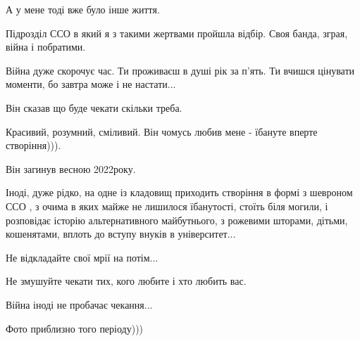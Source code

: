 А у мене тоді вже було інше життя. 

Підрозділ ССО в який я з такими жертвами пройшла відбір. Своя банда, зграя,
війна і побратими. 

Війна дуже скорочує час. Ти проживаєш в душі рік за п'ять. Ти вчишся цінувати
моменти, бо завтра може і не настати...

Він сказав що буде чекати скільки треба.

Красивий, розумний, сміливий. Він  чомусь любив мене - їбануте вперте
створіння))).

Він загинув весною 2022року. 

Іноді, дуже рідко, на одне із  кладовищ приходить створіння в формі з шевроном
ССО , з очима в яких майже не лишилося їбанутості, стоїть біля могили, і
розповідає історію альтернативного майбутнього, з рожевими шторами, дітьми,
кошенятами, вплоть до вступу внуків в університет...

Не відкладайте свої мрії на потім...

Не змушуйте чекати тих, кого любите і хто любить вас.

Війна іноді не пробачає чекання...

Фото приблизно того періоду)))
